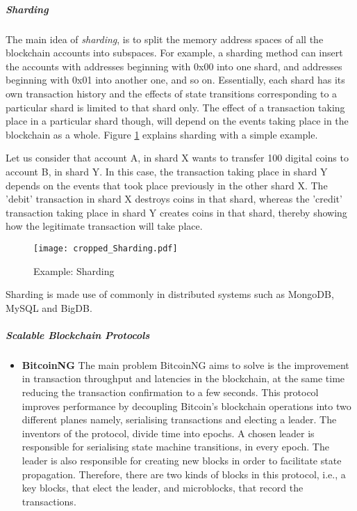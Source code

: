 \documentclass[english]{tktltiki}
\begin{document}
\begin{enumerate}
\subparagraph{Sharding}
The main idea of \textit{sharding}\cite{shard}, is to split the memory address spaces of all the blockchain accounts into subspaces. For example, a sharding method can insert the accounts with addresses beginning with 0x00 into one shard, and addresses beginning with 0x01 into another one, and so on. Essentially, each shard has its own transaction history and the effects of state transitions corresponding to a particular shard is limited to that shard only. The effect of a transaction taking place in a particular shard though, will depend on the events taking place in the blockchain as a whole. Figure \ref{sharding} explains sharding with a simple example. 

Let us consider that account A, in shard X wants to transfer 100 digital coins to account B, in shard Y. In this case, the transaction taking place in shard Y depends on the events that took place previously in the other shard X. The 'debit' transaction in shard X destroys coins in that shard, whereas the 'credit' transaction taking place in shard Y creates coins in that shard, thereby showing how the legitimate transaction will take place.

\begin{figure}[H]
\begin{center}
\texttt{[image: cropped\_Sharding.pdf]}
\caption{Example: Sharding}
\label{sharding}
\end{center}
\end{figure}

Sharding is made use of commonly in distributed systems such as MongoDB, MySQL and BigDB.

\subparagraph{Scalable Blockchain Protocols}
\begin{itemize}
\item \textbf{BitcoinNG}\cite{bitcoinng}
The main problem BitcoinNG aims to solve is the improvement in transaction throughput and latencies in the blockchain, at the same time reducing the transaction confirmation to a few seconds. This protocol improves performance by decoupling Bitcoin's blockchain operations into two different planes namely, serialising transactions and electing a leader. The inventors of the protocol, divide time into epochs. A chosen leader is responsible for serialising state machine transitions, in every epoch. The leader is also responsible for creating new blocks in order to facilitate state propagation. Therefore, there are two kinds of blocks in this protocol, i.e., a key blocks, that elect the leader, and microblocks, that record the transactions.


\end{itemize}
\end{enumerate}
\end{document}
